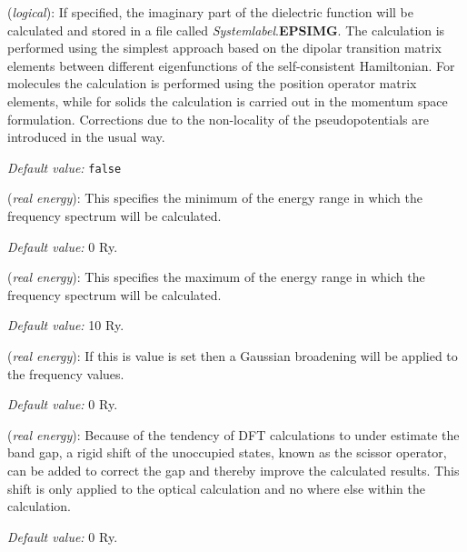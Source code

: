\begin{description}
\itemsep 10pt
\parsep 0pt

\item[\textbf{OpticalCalculation}] (\textit{logical}):
If specified, the imaginary part of the dielectric function
will be calculated and stored in a file called \textit{Systemlabel}.\textbf{EPSIMG}.
The calculation is performed using the simplest approach based on the
dipolar transition matrix elements between different eigenfunctions
of the self-consistent Hamiltonian. For molecules the calculation
is performed using the position operator matrix elements, while
for solids the calculation is carried out in the momentum space
formulation.
Corrections due to the non-locality of the pseudopotentials
are introduced in the usual way.

\textit{Default value:} \texttt{false}

\item[\textbf{Optical.EnergyMinimum}] (\textit{real energy}):
This specifies the minimum of the energy range in which
the frequency spectrum will be calculated.

\textit{Default value:} 0 Ry.

\item[\textbf{Optical.EnergyMaximum}] (\textit{real energy}):
This specifies the maximum of the energy range in which
the frequency spectrum will be calculated.

\textit{Default value:} 10 Ry.

\item[\textbf{Optical.Broaden}] (\textit{real energy}):
If this is value is set then a Gaussian broadening will be
applied to the frequency values.

\textit{Default value:} 0 Ry.

\item[\textbf{Optical.Scissor}] (\textit{real energy}):
Because of the tendency of DFT calculations to under estimate
the band gap, a rigid shift of the unoccupied states, known as
the scissor operator, can be added to correct the gap and
thereby improve the calculated results. This shift is only
applied to the optical calculation and no where else within
the calculation.

\textit{Default value:} 0 Ry.


\end{description}
